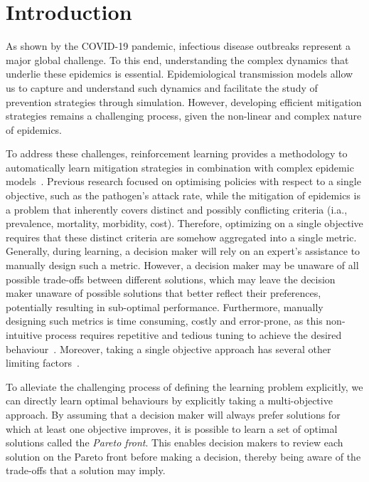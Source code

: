 \documentclass{article}
\renewcommand{\cite}[1]{\citep{#1}}
\begin{document}
\section{Introduction}
As shown by the COVID-19 pandemic, infectious disease outbreaks represent a major global challenge. To this end, understanding the complex dynamics that underlie these epidemics is essential. Epidemiological transmission models allow us to capture and understand such dynamics and facilitate the study of prevention strategies through simulation. However, developing efficient mitigation strategies remains a challenging process, given the non-linear and complex nature of epidemics. 

To address these challenges, reinforcement learning provides a methodology to automatically learn mitigation strategies in combination with complex epidemic models~\cite{libin2020}.
Previous research focused on optimising policies with respect to a single objective, such as the pathogen's attack rate, while the mitigation of epidemics is a problem that inherently covers distinct  and possibly conflicting criteria (i.a., prevalence, mortality, morbidity, cost). Therefore, optimizing on a single objective requires that  these distinct criteria are somehow aggregated into a single metric.
Generally, during learning, a decision maker will rely on an expert's assistance to manually design such a metric. However, a decision maker may
be unaware of all possible trade-offs between different solutions, which may leave the decision maker unaware of possible solutions that better reflect their preferences, potentially resulting in sub-optimal performance. Furthermore, manually designing such metrics is time consuming, costly and error-prone, as this non-intuitive process requires repetitive and tedious tuning to achieve the desired behaviour~\cite{hayes2021practical}. Moreover, taking a single objective approach has several other limiting factors~\cite{hayes2021practical,roijers2013survey}. 

To alleviate the challenging process of defining the learning problem explicitly, we can directly learn optimal behaviours by explicitly taking a multi-objective approach. By assuming that a decision maker will always prefer solutions for which at least one objective improves, it is possible to learn a set of optimal solutions called the \emph{Pareto front}. This enables decision makers to review each solution on the Pareto front before making a decision, thereby being aware of the trade-offs that a solution may imply. 
\end{document}
